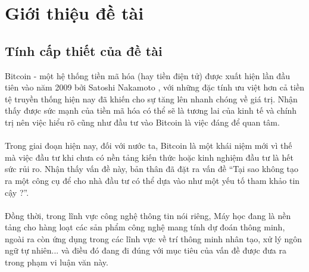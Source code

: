 \chapter{Giới thiệu đề tài}
\section{Tính cấp thiết của đề tài}
Bitcoin - một hệ thống tiền mã hóa (hay tiền điện tử) được xuất hiện lần đầu tiên 
vào năm 2009 bởi Satoshi Nakamoto \cite{BitcoinPaper}, với những đặc tính ưu việt hơn cả tiền tệ 
truyền thống hiện nay đã khiến cho sự tăng lên nhanh chóng về giá trị. Nhận thấy 
được sức mạnh của tiền mã hóa có thể sẽ là tương lai của kinh tế và chính trị 
nên việc hiểu rõ cũng như đầu tư vào Bitcoin là việc đáng để quan tâm.\\\\
Trong giai đoạn hiện nay, đối với nước ta, Bitcoin là một khái niệm mới vì thế 
mà việc đầu tư khi chưa có nền tảng kiến thức hoặc kinh nghiệm đầu tư là hết 
sức rủi ro. Nhận thấy vấn đề này, bản thân đã đặt ra vấn đề ``Tại sao không 
tạo ra một công cụ để cho nhà đầu tư có thể dựa vào như một yếu tố tham khảo 
tin cậy ?''.\\\\
Đồng thời, trong lĩnh vực công nghệ thông tin nói riêng, Máy học đang là 
nền tảng cho hàng loạt các sản phẩm công nghệ mang tính dự đoán thông minh, ngoài 
ra còn ứng dụng trong các lĩnh vực về trí thông minh nhân tạo, xử lý ngôn ngữ 
tự nhiên... và điều đó đang đi đúng với mục tiêu của vấn đề được đưa ra trong phạm 
vi luận văn này.

